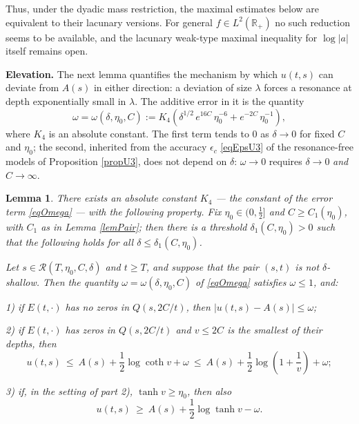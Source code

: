 \documentclass[11pt,twoside,reqno]{amsart}
\def\to{\rightarrow}
\def\R{{\mathbb R}}
\def\RR{{\mathcal{R}}}
\def\d{\delta}
\theoremstyle{plain}
\newtheorem{lemma}{Lemma}
\numberwithin{equation}{section}
\begin{document}
Thus, under the dyadic mass restriction, the maximal estimates below are equivalent to their lacunary versions. For general $f\in L^2(\R_+)$ no such reduction seems to be available, and the lacunary weak-type maximal inequality for $\log|a|$ itself remains open.

{\bf Elevation.} The next lemma quantifies the mechanism by which $u(t,s)$ can deviate from $A(s)$ in either direction: a deviation of size $\lambda$ forces a resonance at depth exponentially small in $\lambda$. The additive error in it is the quantity
\begin{equation}
\omega=\omega(\d,\eta_0,C):=K_4\left(\d^{1/2}\,e^{16C}\,\eta_0^{-6}+e^{-2C}\,\eta_0^{-1}\right),
\label{eqOmega}
\end{equation}
where $K_4$ is an absolute constant. The first term tends to $0$ as $\d\to0$ for fixed $C$ and $\eta_0$; the second, inherited from the accuracy $\epsilon_c$ \eqref{eqEpsU3} of the resonance-free models of Proposition \ref{propU3}, does not depend on $\d$: $\omega\to0$ requires $\d\to0$ {\it and} $C\to\infty$.

\begin{lemma}\label{lemElev}
There exists an absolute constant $K_4$ --- the constant of the error term \eqref{eqOmega} --- with the following property. Fix $\eta_0\in(0,\tfrac12]$ and $C\geq C_1(\eta_0)$, with $C_1$ as in Lemma \ref{lemPair}; then there is a threshold $\d_1(C,\eta_0)>0$ such that the following holds for all $\d\leq\d_1(C,\eta_0)$.

Let $s\in\RR(T,\eta_0,C,\d)$ and $t\geq T$, and suppose that the pair $(s,t)$ is not $\d$-shallow. Then the quantity $\omega=\omega(\d,\eta_0,C)$ of \eqref{eqOmega} satisfies $\omega\leq1$, and:

1) if $E(t,\cdot)$ has no zeros in $Q(s,2C/t)$, then $|u(t,s)-A(s)|\leq\omega$;

2) if $E(t,\cdot)$ has zeros in $Q(s,2C/t)$ and $v\leq2C$ is the smallest of their depths, then
$$u(t,s)\ \leq\ A(s)+\frac12\log\coth v+\omega\ \leq\ A(s)+\frac12\log\left(1+\frac1v\right)+\omega ;$$

3) if, in the setting of part 2), $\tanh v\geq\eta_0$, then also
$$u(t,s)\ \geq\ A(s)+\frac12\log\tanh v-\omega .$$
\end{lemma}
\end{document}
